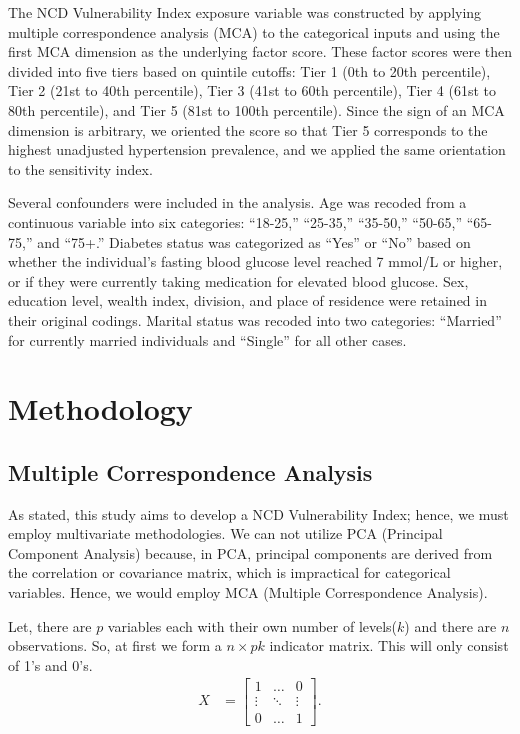 \documentclass[
  12pt,
  a4paper]{article}
\begin{document}
The NCD Vulnerability Index exposure variable was constructed by applying multiple correspondence analysis (MCA) to the categorical inputs and using the first MCA dimension as the underlying factor score. These factor scores were then divided into five tiers based on quintile cutoffs: Tier 1 (0th to 20th percentile), Tier 2 (21st to 40th percentile), Tier 3 (41st to 60th percentile), Tier 4 (61st to 80th percentile), and Tier 5 (81st to 100th percentile). Since the sign of an MCA dimension is arbitrary, we oriented the score so that Tier 5 corresponds to the highest unadjusted hypertension prevalence, and we applied the same orientation to the sensitivity index.

Several confounders were included in the analysis. Age was recoded from a continuous variable into six categories: ``18-25,'' ``25-35,'' ``35-50,'' ``50-65,'' ``65-75,'' and ``75+.'' Diabetes status was categorized as ``Yes'' or ``No'' based on whether the individual's fasting blood glucose level reached 7 mmol/L or higher, or if they were currently taking medication for elevated blood glucose. Sex, education level, wealth index, division, and place of residence were retained in their original codings. Marital status was recoded into two categories: ``Married'' for currently married individuals and ``Single'' for all other cases.

\section{Methodology}\label{methodology}

\subsection{Multiple Correspondence Analysis}\label{multiple-correspondence-analysis}

As stated, this study aims to develop a NCD Vulnerability Index; hence, we must employ multivariate methodologies. We can not utilize PCA (Principal Component Analysis) because, in PCA, principal components are derived from the correlation or covariance matrix, which is impractical for categorical variables. Hence, we would employ MCA (Multiple Correspondence Analysis).

Let, there are \(p\) variables each with their own number of levels(\(k\)) and there are \(n\) observations. So, at first we form a \(n \times {pk}\) indicator matrix. This will only consist of 1's and 0's.
\begin{align*}
  X &= \begin{bmatrix}
    1 & \dots & 0\\
    \vdots & \ddots & \vdots\\
    0 & \dots  & 1
  \end{bmatrix}.
\end{align*}
\end{document}

